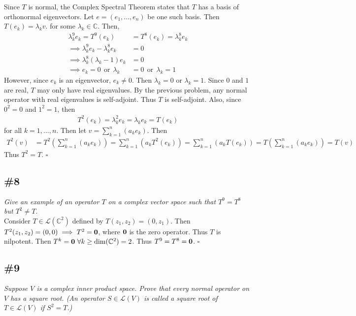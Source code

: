 \documentclass[12pt]{article}
\begin{document}
\noindent Since $T$ is normal, the Complex Spectral Theorem states that $T$ has a basis of orthonormal eigenvectors.  Let $e = (e_1, \dots, e_n)$ be one such basis.  Then $T(e_k) = \lambda_kv$.  for some $\lambda_k \in \mathbb{C}$.  Then,
\begin{align*}
		\lambda_k^9{e_k} = T^9({e_k}) &= T^8({e_k}) = \lambda_k^8{e_k} \\
		\implies \lambda_k^9{e_k} - \lambda_k^8{e_k} &= 0 \\
		\implies \lambda_k^8(\lambda_k - 1){e_k} &= 0 \\
		\implies {e_k} = 0\ \ \text{or}\ \ \lambda_k &= 0\ \ \text{or}\ \ \lambda_k = 1
\end{align*}
However, since ${e_k}$ is an eigenvector, ${e_k} \neq 0$.  Then $\lambda_k = 0$ or $\lambda_k = 1$.  Since $0$ and $1$ are real, $T$ may only have real eigenvalues.  By the previous problem, any normal operator with real eigenvalues is self-adjoint.  Thus $T$ is self-adjoint.  Also, since $0^2 = 0$ and $1^2 = 1$, then
\begin{align*}
		T^2({e_k}) = \lambda_k^2{e_k} = \lambda_k {e_k} = T({e_k})
\end{align*}
for all $k = 1, \dots, n$.  Then let $v = \displaystyle\sum\limits_{k = 1}^{n}(a_ke_k)$.  Then
\begin{align*}
		T^2(v) &= T^2\left(\sum_{k = 1}^{n}(a_ke_k)\right) = \sum_{k = 1}^{n}(a_kT^2(e_k)) = \sum_{k = 1}^{n}(a_kT(e_k)) = T\left(\sum_{k = 1}^{n}(a_ke_k)\right) = T(v)
\end{align*}  Thus $T^2 = T$. \hfill $\square$

\subsection*{\#8}
{\it Give an example of an operator $T$ on a complex vector space such that $T^9 = T^8$ but $T^2 \neq T$.} \\

\noindent Consider $T \in \mathcal{L}(\mathbb{C}^2)$ defined by $T(z_1, z_2) = (0, z_1)$.  Then $T^2(z_1, z_2) = (0, 0) \implies T^2 = \bf{0}$, where $\bf{0}$ is the zero operator.  Thus $T$ is nilpotent.  Then $T^k = {\bf0}\ \forall k \geq \text{dim}(\mathbb{C}^2) = 2$.  Thus $T^9 = T^8 = {\bf 0}$. \hfill $\square$

\subsection*{\#9}
{\it Suppose $V$ is a complex inner product space.  Prove that every normal operator on $V$ has a square root.  (An operator $S \in \mathcal{L}(V)$ is called a square root of $T \in \mathcal{L}(V)$ if $S^2 = T$.)} \\
\end{document}
